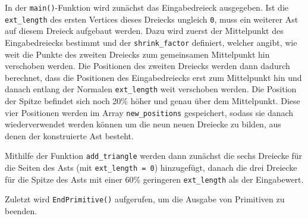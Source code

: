 In der \lstinline{main()}-Funktion wird zunächst das Eingabedreieck ausgegeben. Ist die \lstinline{ext_length} des ersten Vertices dieses Dreiecks ungleich \lstinline{0}, muss ein weiterer Ast auf diesem Dreieck aufgebaut werden. Dazu wird zuerst der Mittelpunkt des Eingabedreiecks bestimmt und der \lstinline{shrink_factor} definiert, welcher angibt, wie weit die Punkte des zweiten Dreiecks zum gemeinsamen Mittelpunkt hin verschoben werden. Die Positionen des zweiten Dreiecks werden dann dadurch berechnet, dass die Positionen des Eingabedreiecks erst zum Mittelpunkt hin und danach entlang der Normalen \lstinline{ext_length} weit verschoben werden. Die Position der Spitze befindet sich noch 20\% höher und genau über dem Mittelpunkt. Diese vier Positionen werden im Array \lstinline{new_positions} gespeichert, sodass sie danach wiederverwendet werden können um die neun neuen Dreiecke zu bilden, aus denen der konstruierte Ast besteht. 

Mithilfe der Funktion \lstinline{add_triangle} werden dann zunächst die sechs Dreiecke für die Seiten des Asts (mit \lstinline{ext_length = 0}) hinzugefügt, danach die drei Dreiecke für die Spitze des Asts mit einer 60\% geringeren \lstinline{ext_length} als der Eingabewert. 

Zuletzt wird \lstinline{EndPrimitive()} aufgerufen, um die Ausgabe von Primitiven zu beenden.